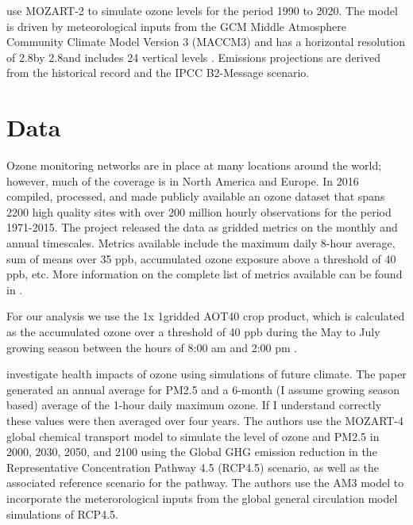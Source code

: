 \documentclass[10pt]{amsart}
\begin{document}
\cite{wang:2004aa} use MOZART-2 to simulate ozone levels for the period 1990 to 2020. 
The model is driven by meteorological inputs from the GCM Middle Atmosphere Community Climate Model Version 3 (MACCM3) and has a horizontal resolution of 2.8\degree by 2.8\degree and includes 24 vertical levels \parencite{wang:2004aa}. 
Emissions projections are derived from the historical record and the IPCC B2-Message scenario. 


\begin{landscape}
\begin{table}
\end{table}
\end{landscape}

\section{Data}
Ozone monitoring networks are in place at many locations around the world; however, much of the coverage is in North America and Europe. 
In 2016 \cite{sofen:2016aa} compiled, processed, and made publicly available an ozone dataset that spans 2200 high quality sites with over 200 million hourly observations for the period 1971-2015.
The project released the data as gridded metrics on the monthly and annual timescales.
Metrics available include the maximum daily 8-hour average, sum of means over 35 ppb, accumulated ozone exposure above a threshold of 40 ppb, etc. 
More information on the complete list of metrics available can be found in \cite{sofen:2016aa}.

For our analysis we use the 1\degree x 1\degree gridded AOT40 crop product, which is calculated as the accumulated ozone over a threshold of 40 ppb during the May to July growing season between the hours of 8:00 am and 2:00 pm \parencite{sofen:2016aa}.

\cite{} investigate health impacts of ozone using simulations of future climate. 
The \cite{j:2013aa} paper generated an annual average for PM2.5 and a 6-month (I assume growing season based) average of the 1-hour daily maximum ozone. 
If I understand correctly these values were then averaged over four years. 
The authors use the MOZART-4 global chemical transport model to simulate the level of ozone and PM2.5 in 2000, 2030, 2050, and 2100 using the Global GHG emission reduction in the Representative Concentration Pathway 4.5 (RCP4.5) scenario, as well as the associated reference scenario for the pathway.
The authors use the AM3 model to incorporate the meterorological inputs from the global general circulation model simulations of RCP4.5.  
\end{document}
